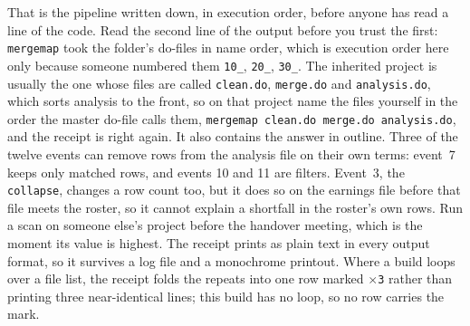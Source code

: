 \documentclass[
    a4paper,
    fontsize=10pt,
    twoside=true,
    numbers=noenddot,
]{kaobook}
\begin{document}
That is the pipeline written down, in execution order, before anyone has read a line of the code. Read the second line of the output before you trust the first: \texttt{mergemap} took the folder's do-files in name order, which is execution order here only because someone numbered them \texttt{10\_}, \texttt{20\_}, \texttt{30\_}. The inherited project is usually the one whose files are called \texttt{clean.do}, \texttt{merge.do} and \texttt{analysis.do}, which sorts analysis to the front, so on that project name the files yourself in the order the master do-file calls them, \texttt{mergemap clean.do merge.do analysis.do}, and the receipt is right again. It also contains the answer in outline. Three of the twelve events can remove rows from the analysis file on their own terms: event~7 keeps only matched rows, and events 10 and 11 are filters. Event~3, the \texttt{collapse}, changes a row count too, but it does so on the earnings file before that file meets the roster, so it cannot explain a shortfall in the roster's own rows. Run a scan on someone else's project before the handover meeting, which is the moment its value is highest. The receipt prints as plain text in every output format, so it survives a log file and a monochrome printout. Where a build loops over a file list, the receipt folds the repeats into one row marked \texttt{$\times$3} rather than printing three near-identical lines; this build has no loop, so no row carries the mark.
\end{document}
